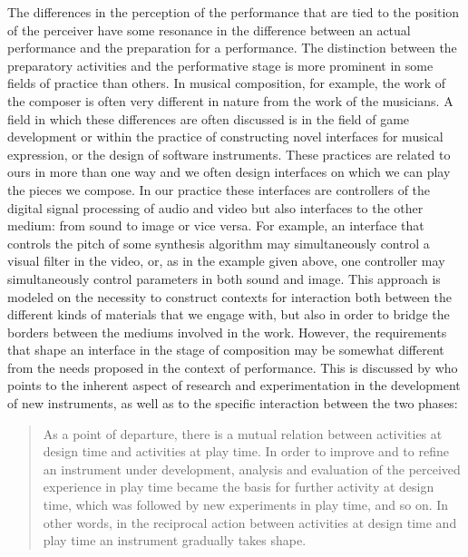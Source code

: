 \documentclass[11pt]{article}
\begin{document}
The differences in the perception of the performance that are tied to
the position of the perceiver have some
resonance in the difference between an actual performance and the
preparation for a performance.
The distinction between the preparatory activities and the
performative stage is more prominent in some fields of practice than
others. In musical composition, for example, the work of the
composer is often very different in nature from the work of the
musicians. A field in which these differences are often discussed is
in the field of game development or within the practice of 
constructing novel interfaces for musical expression, or the
design of software instruments. These practices are related to ours in
more than one way and we often design interfaces on which we can
play the pieces we compose. In our practice these interfaces are controllers of the
digital signal processing of audio and video but also interfaces to the other
medium: from sound to image or vice versa. For example, an interface that controls the pitch of some
synthesis algorithm may simultaneously control a visual filter in the
video, or, as in the example given above, one controller may
simultaneously control parameters in both sound and image. This approach is modeled on the necessity to
construct contexts for interaction both between the different kinds of
materials that we engage with, but also in order to bridge the borders
between the mediums involved in the work. However, the requirements
that shape an interface in the stage of composition may be somewhat
different from the needs proposed in the context of performance. This
is discussed by \citet{Nilsson2011} who points to the inherent aspect
of research and experimentation in the development of new instruments,
as well as to the specific interaction between the two phases:

\begin{quote}
As a point of departure, there is a mutual relation between activities at design time and activities at play time. In order to improve and to refine an instrument under development, analysis and evaluation of the perceived experience in play time became the basis for further activity at design time, which was followed by new experiments in play time, and so on.  In other words, in the reciprocal action between activities at design time and play time an instrument gradually takes shape. \citep[p. 25]{Nilsson2011}
\end{quote}
\end{document}

